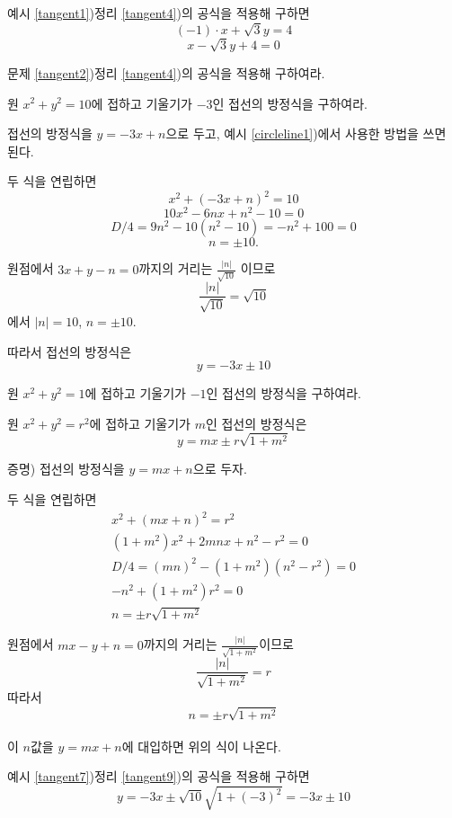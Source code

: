 \documentclass{oblivoir}
\begin{document}
%
\exam{}\label{tangent5}
예시 \ref{tangent1})\을 정리 \ref{tangent4})의 공식을 적용해 구하면
\[(-1)\cdot x+\sqrt3y=4\]
\[x-\sqrt3y+4=0\]

%
\prob{}\label{tangent6}
문제 \ref{tangent2})\을 정리 \ref{tangent4})의 공식을 적용해 구하여라.

\newpage
%
\exam{}\label{tangent7}
원 \(x^2+y^2=10\)에 접하고 기울기가 \(-3\)인 접선의 방정식을 구하여라.
\begin{mdframed}
접선의 방정식을 \(y=-3x+n\)으로 두고, 예시 \ref{circleline1})에서 사용한 방법을 쓰면 된다.
\bigskip

\noindent{}
두 식을 연립하면
\[x^2+(-3x+n)^2=10\]
\[10x^2-6nx+n^2-10=0\]
\[D/4=9n^2-10(n^2-10)=-n^2+100=0\]
\[n=\pm10.\]

\noindent{}
원점에서 \(3x+y-n=0\)까지의 거리는
\(\frac{|n|}{\sqrt{10}}\)
이므로
\[\frac{|n|}{\sqrt{10}}=\sqrt{10}\]
에서 \(|n|=10\), \(n=\pm10\).

\noindent\dotfill\hfill

따라서 접선의 방정식은
\[y=-3x\pm10\]
\end{mdframed}

%
\prob{}\label{tangent8}
원 \(x^2+y^2=1\)에 접하고 기울기가 \(-1\)인 접선의 방정식을 구하여라.
\bigskip\bigskip

\newpage
\begin{mdframed}
%
\theo{}\label{tangent9}
원 \(x^2+y^2=r^2\)에 접하고 기울기가 \(m\)인 접선의 방정식은
\[y=mx\pm r\sqrt{1+m^2}\]
\end{mdframed}
\bigskip\noindent\textsf{증명)} 접선의 방정식을 \(y=mx+n\)으로 두자.\bigskip

\noindent{}
두 식을 연립하면
\begin{gather*}
x^2+(mx+n)^2=r^2\\
(1+m^2)x^2+2mnx+n^2-r^2=0\\
D/4=(mn)^2-(1+m^2)(n^2-r^2)=0\\
-n^2+(1+m^2)r^2=0\\
n=\pm r\sqrt{1+m^2}
\end{gather*}

\noindent{}
원점에서 \(mx-y+n=0\)까지의 거리는 \(\frac{|n|}{\sqrt{1+m^2}}\)이므로
\[\frac{|n|}{\sqrt{1+m^2}}=r\]
따라서
\[n=\pm r\sqrt{1+m^2}\]
\noindent\dotfill\hfill\\
이 \(n\)값을 \(y=mx+n\)에 대입하면 위의 식이 나온다.

%
\exam{}\label{tangent10}
예시 \ref{tangent7})\을 정리 \ref{tangent9})의 공식을 적용해 구하면
\[y=-3x\pm\sqrt{10}\sqrt{1+(-3)^2}=-3x\pm10\]
\end{document}
